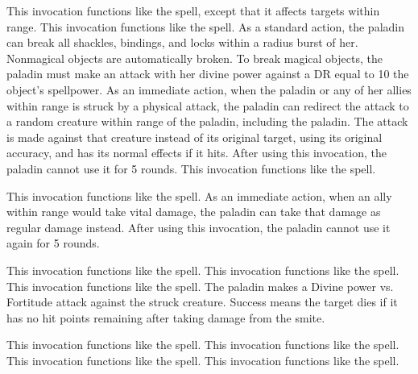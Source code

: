          This invocation functions like the  spell, except that it affects targets within \rngmed range.
         This invocation functions like the  spell.
        As a standard action, the paladin can break all shackles, bindings, and locks within a \arealarge radius burst of her.
        Nonmagical objects are automatically broken.
        To break magical objects, the paladin must make an attack with her divine power against a DR equal to 10 \add the object's spellpower.
        As an immediate action, when the paladin or any of her allies within \rngclose range is struck by a physical attack, the paladin can redirect the attack to a random creature within \rngclose range of the paladin, including the paladin.
        The attack is made against that creature instead of its original target, using its original accuracy, and has its normal effects if it hits.
        After using this invocation, the paladin cannot use it for 5 rounds.
         This invocation functions like the  spell.

        This invocation functions like the  spell.
        As an immediate action, when an ally within \rngmed range would take vital damage, the paladin can take that damage as regular damage instead.
        After using this invocation, the paladin cannot use it again for 5 rounds.

         This invocation functions like the  spell.
         This invocation functions like the  spell.
         This invocation functions like the  spell.
        The paladin makes a Divine power vs. Fortitude attack against the struck creature.
        Success means the target dies if it has no hit points remaining after taking damage from the smite.

         This invocation functions like the  spell.
         This invocation functions like the  spell.
         This invocation functions like the  spell.
         This invocation functions like the  spell.

